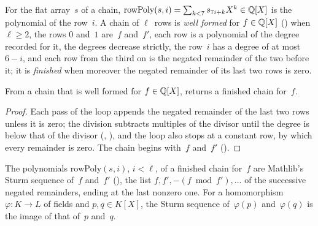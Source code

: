 
\begin{definition}\label{def:SturmChain.IsFinished}
  \leanok
  For the flat array~$s$ of a chain,
  $\mathrm{rowPoly}(s, i) = \sum_{k < 7} s_{7i + k} X^k \in \mathbb{Q}[X]$ is the polynomial of the
  row~$i$. A chain of $\ell$~rows is \emph{well formed} for $f \in \mathbb{Q}[X]$
  () when $\ell \ge 2$, the rows $0$ and~$1$ are~$f$ and~$f'$, each row
  is a polynomial of the degree recorded for it, the degrees decrease strictly, the row~$i$ has a
  degree of at most $6 - i$, and each row from the third on is the negated remainder of the two
  before it; it is \emph{finished} when moreover the negated remainder of its last two rows is zero.
\end{definition}

\begin{lemma}\label{lem:realRootsChain_spec}
  \leanok
  From a chain that is well formed for $f \in \mathbb{Q}[X]$,  returns a
  finished chain for~$f$.
\end{lemma}

\begin{proof}
  \leanok
  Each pass of the loop appends the negated remainder of the last two rows unless it is zero; the
  division subtracts multiples of the divisor until the degree is below that of the divisor
  (, ), and the loop also
  stops at a constant row, by which every remainder is zero. The chain begins with~$f$ and~$f'$
  ().
\end{proof}

\begin{lemma}\label{lem:SturmChain.IsFinished.map_rowPoly_eq_sturmSeq}
  \leanok
  The polynomials $\mathrm{rowPoly}(s, i)$, $i < \ell$, of a finished chain for~$f$ are Mathlib's
  Sturm sequence of~$f$ and~$f'$ (), the list
  $f, f', -(f \bmod f'), \dots$ of the successive negated remainders, ending at the last nonzero
  one. For a homomorphism $\varphi \colon K \to L$ of fields and $p, q \in K[X]$, the Sturm sequence
  of~$\varphi(p)$ and~$\varphi(q)$ is the image of that of~$p$ and~$q$.
\end{lemma}

